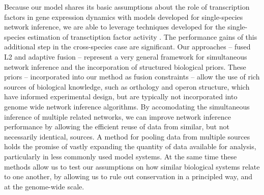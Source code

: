 \documentclass[11pt]{article}
\begin{document}
Because our model shares its basic assumptions about the role of transcription factors in gene expression dynamics with models developed for single-species network inference, we are able to leverage techniques developed for the single-species estimation of transctiption factor activity \cite{fu_reconstructing_2011}. 
The performance gains of this additional step in the cross-species case are significant.
Our approaches -- fused L2 and adaptive fusion -- represent a very general framework for simultaneous network inference and the incorporation of structured biological priors. 
These priors -- incorporated into our method as fusion constraints -- allow the use of rich sources of biological knowledge, such as orthology and operon structure, which have informed experimental design, but are typically not incorporated into genome wide network inference algorithms. 
By accomodating the simultaneous inference of multiple related networks, we can improve network inference performance by allowing the efficient reuse of data from similar, but not necessarily identical, sources. 
A method for pooling data from multiple sources holds the promise of vastly expanding the quantity of data available for analysis, particularly in less commonly used model systems. 
At the same time these methods allow us to test our assumptions on how similar biological systems relate to one another, by allowing us to rule out conservation in a principled way, and at the genome-wide scale. 





\end{document}
